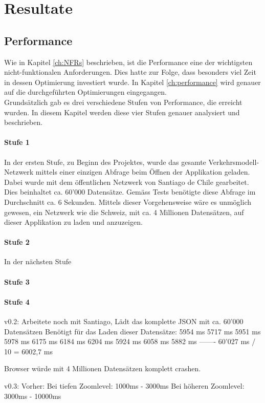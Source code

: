 \chapter{Resultate}
\section{Performance}
Wie in Kapitel \ref{ch:NFRs}  beschrieben, ist die Performance eine der wichtigsten nicht-funktionalen Anforderungen. Dies hatte zur Folge, dass besonders viel Zeit in dessen Optimierung investiert wurde. In Kapitel \ref{ch:performance}  wird genauer auf die durchgeführten Optimierungen eingegangen.\\
Grundsätzlich gab es drei verschiedene Stufen von Performance, die erreicht wurden. In diesem Kapitel werden diese vier Stufen genauer analysiert und beschrieben.
\subsubsection*{Stufe 1}
In der ersten Stufe, zu Beginn des Projektes, wurde das gesamte Verkehrsmodell-Netzwerk mittels einer einzigen Abfrage beim Öffnen der Applikation geladen. Dabei wurde mit dem öffentlichen Netzwerk von Santiago de Chile gearbeitet. Dies beinhaltet ca. 60'000 Datensätze. Gemäss Tests benötigte diese Abfrage im Durchschnitt ca. 6 Sekunden. Mittels dieser Vorgehensweise wäre es unmöglich gewesen, ein Netzwerk wie die Schweiz, mit ca. 4 Millionen Datensätzen, auf dieser Applikation zu laden und anzuzeigen.
\subsubsection*{Stufe 2}
In der nächsten Stufe 
\subsubsection*{Stufe 3}
\subsubsection*{Stufe 4}
v0.2:
Arbeitete noch mit Santiago, Lädt das komplette JSON mit ca. 60'000 Datensätzen
Benötigt für das Laden dieser Datensätze:
5954 ms
5717 ms
5951 ms
5978 ms
6175 ms
6184 ms
6204 ms
5924 ms
6058 ms
5882 ms
-------
60'027 ms / 10 = 6002,7 ms

Browser würde mit 4 Millionen Datensätzen komplett crashen.

v0.3:
Vorher:
Bei tiefen Zoomlevel:
1000ms - 3000ms
Bei höheren Zoomlevel:
3000ms - 10000ms

